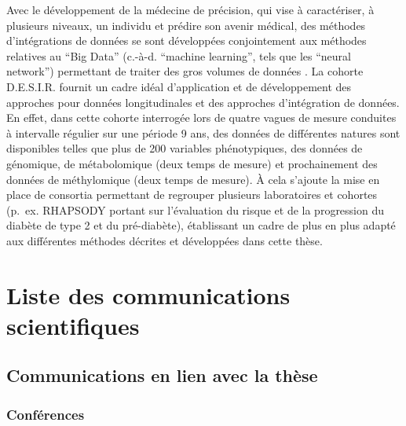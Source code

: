 \documentclass[11pt,a4paper,notrimn]{krantz}
\theoremstyle{definition}
\theoremstyle{definition}
\theoremstyle{remark}
\begin{document}
Avec le développement de la médecine de précision, qui vise à
caractériser, à plusieurs niveaux, un individu et prédire son avenir
médical, des méthodes d'intégrations de données se sont développées
conjointement aux méthodes relatives au ``Big Data'' (c.-à-d. ``machine
learning'', tels que les ``neural network'') permettant de traiter des
gros volumes de données \citep{huang_more_2017, lin_machine_2017}. La
cohorte D.E.S.I.R. fournit un cadre idéal d'application et de
développement des approches pour données longitudinales et des approches
d'intégration de données. En effet, dans cette cohorte interrogée lors
de quatre vagues de mesure conduites à intervalle régulier sur une
période 9 ans, des données de différentes natures sont disponibles
telles que plus de 200 variables phénotypiques, des données de
génomique, de métabolomique (deux temps de mesure) et prochainement des
données de méthylomique (deux temps de mesure). À cela s'ajoute la mise
en place de consortia permettant de regrouper plusieurs laboratoires et
cohortes (p.~ex. RHAPSODY portant sur l'évaluation du risque et de la
progression du diabète de type 2 et du pré-diabète), établissant un
cadre de plus en plus adapté aux différentes méthodes décrites et
développées dans cette thèse.

\chapter*{Liste des communications
scientifiques}\label{liste-des-communications-scientifiques}


\setcounter{section}{0}

\section{Communications en lien avec la
thèse}\label{communications-en-lien-avec-la-these}

\subsection{Conférences}\label{conferences}
\end{document}
